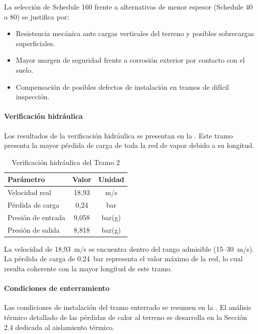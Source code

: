 La selección de Schedule 160 frente a alternativas de menor espesor (Schedule 40 o 80) se justifica por:
\begin{itemize}[noitemsep]
	\item Resistencia mecánica ante cargas verticales del terreno y posibles sobrecargas superficiales.
	\item Mayor margen de seguridad frente a corrosión exterior por contacto con el suelo.
	\item Compensación de posibles defectos de instalación en tramos de difícil inspección.
\end{itemize}

\paragraph{Verificación hidráulica}

Los resultados de la verificación hidráulica se presentan en la . Este tramo presenta la mayor pérdida de carga de toda la red de vapor debido a su longitud.

\begin{table}[H]
	\centering
	\caption{Verificación hidráulica del Tramo 2}
	\label{tab:hidraulica-tramo2}
	\begin{tabular}{lcc}
		\toprule
		\textbf{Parámetro} & \textbf{Valor} & \textbf{Unidad} \\
		\midrule
		Velocidad real     & 18{,}93        & m/s             \\
		Pérdida de carga   & 0{,}24         & bar             \\
		Presión de entrada & 9{,}058        & bar(g)          \\
		Presión de salida  & 8{,}818        & bar(g)          \\
		\bottomrule
	\end{tabular}
\end{table}

La velocidad de 18{,}93~m/s se encuentra dentro del rango admisible (15--30~m/s). La pérdida de carga de 0{,}24~bar representa el valor máximo de la red, lo cual resulta coherente con la mayor longitud de este tramo.

\paragraph{Condiciones de enterramiento}

Las condiciones de instalación del tramo enterrado se resumen en la . El análisis térmico detallado de las pérdidas de calor al terreno se desarrolla en la Sección 2.4 dedicada al aislamiento térmico.

